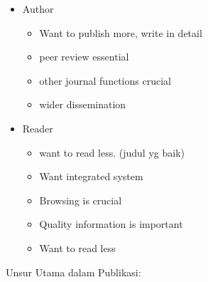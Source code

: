 \documentclass[
  letterpaper,
  DIV=11,
  numbers=noendperiod]{scrreprt}
\providecommand{\tightlist}{%
  \setlength{\itemsep}{0pt}\setlength{\parskip}{0pt}}\usepackage{longtable,booktabs,array}
\begin{document}
\begin{itemize}
\tightlist
\item
  Author

  \begin{itemize}
  \tightlist
  \item
    Want to publish more, write in detail
  \item
    peer review essential
  \item
    other journal functions crucial
  \item
    wider dissemination
  \end{itemize}
\item
  Reader

  \begin{itemize}
  \tightlist
  \item
    want to read less. (judul yg baik)
  \item
    Want integrated system
  \item
    Browsing is crucial
  \item
    Quality information is important
  \item
    Want to read less
  \end{itemize}
\end{itemize}

Unsur Utama dalam Publikasi:
\end{document}
